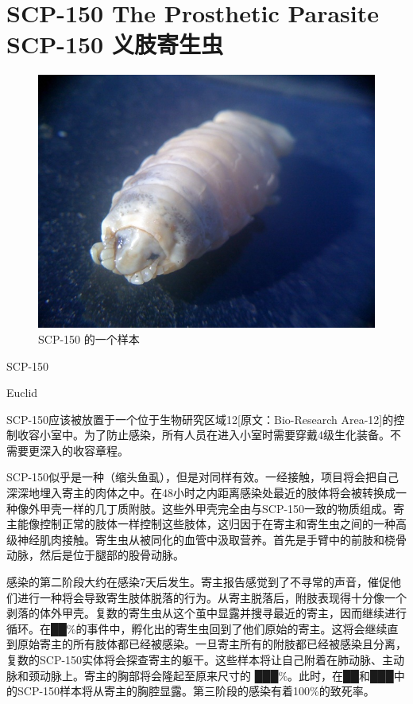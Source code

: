\chapter[SCP-150 义肢寄生虫]{
    SCP-150 The Prosthetic Parasite\\
    SCP-150 义肢寄生虫
}

\label{chap:SCP-150}

\begin{figure}[H]
    \centering
    \includegraphics[width=0.5\linewidth]{images/SCP-150.jpg}
    \caption*{SCP-150 的一个样本}
\end{figure}

SCP-150

Euclid

SCP-150应该被放置于一个位于生物研究区域12{[}原文：Bio-Research Area-12]的控制收容小室中。为了防止感染，所有人员在进入小室时需要穿戴4级生化装备。不需要更深入的收容章程。

SCP-150似乎是一种（缩头鱼虱），但是对同样有效。一经接触，项目将会把自己深深地埋入寄主的肉体之中。在48小时之内距离感染处最近的肢体将会被转换成一种像外甲壳一样的几丁质附肢。这些外甲壳完全由与SCP-150一致的物质组成。寄主能像控制正常的肢体一样控制这些肢体，这归因于在寄主和寄生虫之间的一种高级神经肌肉接触。寄生虫从被同化的血管中汲取营养。首先是手臂中的前肢和桡骨动脉，然后是位于腿部的股骨动脉。

感染的第二阶段大约在感染7天后发生。寄主报告感觉到了不寻常的声音，催促他们进行一种将会导致寄生肢体脱落的行为。从寄主脱落后，附肢表现得十分像一个剥落的体外甲壳。复数的寄生虫从这个茧中显露并搜寻最近的寄主，因而继续进行循环。在██\%的事件中，孵化出的寄生虫回到了他们原始的寄主。这将会继续直到原始寄主的所有肢体都已经被感染。一旦寄主所有的附肢都已经被感染且分离，复数的SCP-150实体将会探查寄主的躯干。这些样本将让自己附着在肺动脉、主动脉和颈动脉上。寄主的胸部将会隆起至原来尺寸的 ███\%。此时，在██和███中的SCP-150样本将从寄主的胸腔显露。第三阶段的感染有着100\%的致死率。
